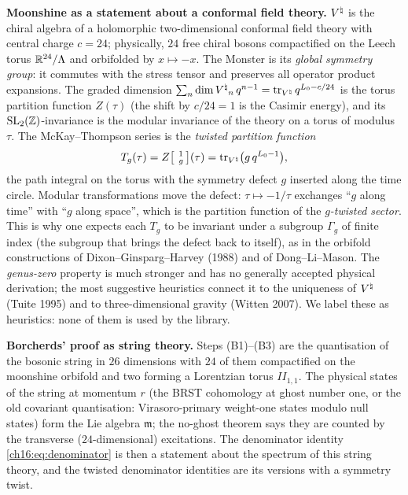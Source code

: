 \begin{physics}
\textbf{Moonshine as a statement about a conformal field theory.}  ${V^{\natural}}$ is the chiral algebra of a holomorphic
two-dimensional conformal field theory with central charge $c=24$; physically, $24$ free chiral bosons compactified
on the Leech torus $\mathbb{R}^{24}/{\Lambda}$ and orbifolded by $x\mapsto-x$.  The Monster is its \emph{global symmetry group}:
it commutes with the stress tensor and preserves all operator product expansions.  The graded dimension
$\sum_n\dim{V^{\natural}}_n\,q^{n-1}=\operatorname{tr}_{{V^{\natural}}}q^{L_0-c/24}$ is the torus partition function $Z(\tau)$ (the shift by
$c/24=1$ is the Casimir energy), and its $\mathrm{SL}_2(\mathbb{Z})$-invariance is the modular invariance of the theory on a torus
of modulus $\tau$.  The McKay--Thompson series is the \emph{twisted partition function}
\begin{equation*}
  T_g(\tau)=Z\bigl[\,{}^{\;1}_{\;g}\,\bigr](\tau)=\operatorname{tr}_{{V^{\natural}}}\bigl(g\,q^{L_0-1}\bigr),
\end{equation*}
the path integral on the torus with the symmetry defect $g$ inserted along the time circle.  Modular
transformations move the defect: $\tau\mapsto-1/\tau$ exchanges ``$g$ along time'' with ``$g$ along space'', which is
the partition function of the \emph{$g$-twisted sector}.  This is why one expects each $T_g$ to be invariant under a
subgroup $\Gamma_g$ of finite index (the subgroup that brings the defect back to itself), as in the orbifold
constructions of Dixon--Ginsparg--Harvey (1988) and of Dong--Li--Mason.  The \emph{genus-zero} property is much
stronger and has no generally accepted physical derivation; the most suggestive heuristics connect it to the
uniqueness of ${V^{\natural}}$ (Tuite 1995) and to three-dimensional gravity (Witten 2007).  We label these as heuristics: none
of them is used by the library.

\textbf{Borcherds' proof as string theory.}  Steps (B1)--(B3) are the quantisation of the bosonic string in $26$
dimensions with $24$ of them compactified on the moonshine orbifold and two forming a Lorentzian torus $I\!I_{1,1}$.
The physical states of the string at momentum $r$ (the BRST cohomology at ghost number one, or the old covariant
quantisation: Virasoro-primary weight-one states modulo null states) form the Lie algebra $\mathfrak m$; the no-ghost
theorem says they are counted by the transverse ($24$-dimensional) excitations.  The denominator identity
\eqref{ch16:eq:denominator} is then a statement about the spectrum of this string theory, and the twisted
denominator identities are its versions with a symmetry twist.
\end{physics}


